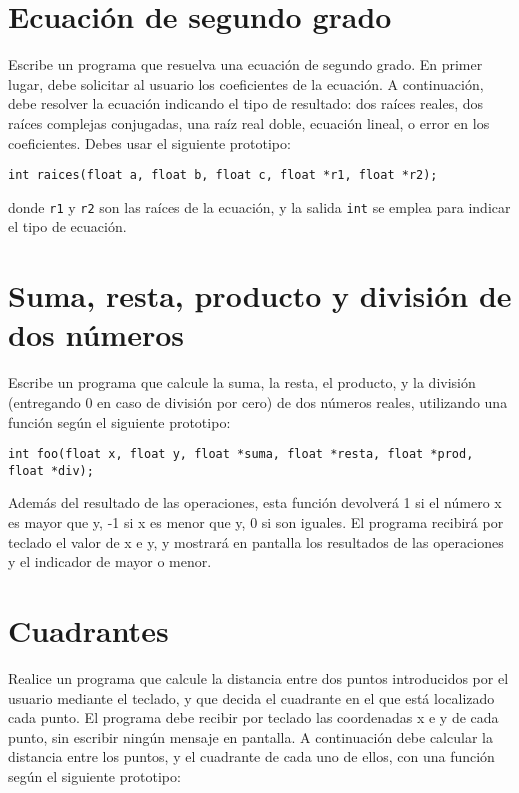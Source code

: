 \documentclass[a4paper]{article}
\begin{document}
\section{Ecuación de segundo grado}
\label{sec:org1c83fa8}

Escribe un programa que resuelva una ecuación de segundo grado. En primer lugar, debe solicitar al usuario los coeficientes de la ecuación. A continuación, debe resolver la ecuación indicando el tipo de resultado: dos raíces reales, dos raíces complejas conjugadas, una raíz real doble, ecuación lineal, o error en los coeficientes. Debes usar el siguiente prototipo:

\lstset{language=C,label= ,caption= ,captionpos=b,numbers=none}
\begin{lstlisting}
int raices(float a, float b, float c, float *r1, float *r2);
\end{lstlisting}

donde \texttt{r1} y \texttt{r2} son las raíces de la ecuación, y la salida \texttt{int} se emplea para indicar el tipo de ecuación.

\section{Suma, resta, producto y división de dos números}
\label{sec:orge2c38ab}
Escribe un programa que calcule la suma, la resta, el producto, y la división (entregando 0 en caso de división por cero) de dos números reales, utilizando una función según el siguiente prototipo:

\lstset{language=C,label= ,caption= ,captionpos=b,numbers=none}
\begin{lstlisting}
int foo(float x, float y, float *suma, float *resta, float *prod, float *div);
\end{lstlisting}
Además del resultado de las operaciones, esta función devolverá 1 si el número x es mayor que y, -1 si x es menor que y, 0 si son iguales.
El programa recibirá por teclado el valor de x e y, y mostrará en pantalla los resultados de las operaciones y el indicador de mayor o menor.


\section{Cuadrantes}
\label{sec:orgef47f72}
Realice un programa que calcule la distancia entre dos puntos introducidos por el usuario mediante el teclado, y que decida el cuadrante en el que está localizado cada punto. El programa debe recibir por teclado las coordenadas x e y de cada punto, sin escribir ningún mensaje en pantalla. A continuación debe calcular la distancia entre los puntos, y el cuadrante de cada uno de ellos, con una función según el siguiente prototipo:
\end{document}
